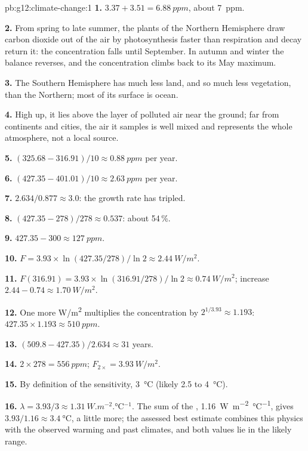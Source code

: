 \begin{solution}{pb:g12:climate-change:1}
\textbf{1.} $3.37 + 3.51 = \qty{6.88}{ppm}$, about \qty{7}{ppm}.

\textbf{2.} From spring to late summer, the plants of the Northern
Hemisphere draw carbon dioxide out of the air by photosynthesis faster than
respiration and decay return it: the concentration falls until September.
In autumn and winter the balance reverses, and the concentration climbs
back to its May maximum.

\textbf{3.} The Southern Hemisphere has much less land, and so much less
vegetation, than the Northern; most of its surface is ocean.

\textbf{4.} High up, it lies above the layer of polluted air near the
ground; far from continents and cities, the air it samples is well mixed and
represents the whole atmosphere, not a local source.

\textbf{5.} $(325.68 - 316.91)/10 \approx \qty{0.88}{ppm}$ per year.

\textbf{6.} $(427.35 - 401.01)/10 \approx \qty{2.63}{ppm}$ per year.

\textbf{7.} $2.634/0.877 \approx 3.0$: the growth rate has tripled.

\textbf{8.} $(427.35 - 278)/278 \approx 0.537$: about 54\,\%.

\textbf{9.} $427.35 - 300 \approx \qty{127}{ppm}$.

\textbf{10.} $F = 3.93 \times \ln(427.35/278)/\ln 2 \approx
\qty{2.44}{W/m^2}$.

\textbf{11.} $F(316.91) = 3.93 \times \ln(316.91/278)/\ln 2 \approx
\qty{0.74}{W/m^2}$; increase $2.44 - 0.74 \approx \qty{1.70}{W/m^2}$.

\textbf{12.} One more \unit{W/m^2} multiplies the concentration by
$2^{1/3.93} \approx 1.193$: $427.35 \times 1.193 \approx \qty{510}{ppm}$.

\textbf{13.} $(509.8 - 427.35)/2.634 \approx 31$ years.

\textbf{14.} $2 \times 278 = \qty{556}{ppm}$;  $F_{2\times} =
\qty{3.93}{W/m^2}$.

\textbf{15.} By definition of the sensitivity, \qty{3}{\degreeCelsius}
(likely 2.5 to \qty{4}{\degreeCelsius}).

\textbf{16.} $\lambda = 3.93/3 \approx \qty{1.31}{W.m^{-2}.\degreeCelsius^{-1}}$.
The sum of the , \qty{1.16}{W.m^{-2}.\degreeCelsius^{-1}}, gives
$3.93/1.16 \approx \qty{3.4}{\degreeCelsius}$, a little more; the assessed
best estimate combines this physics with the observed warming and past
climates, and both values lie in the likely range.


\end{solution}

